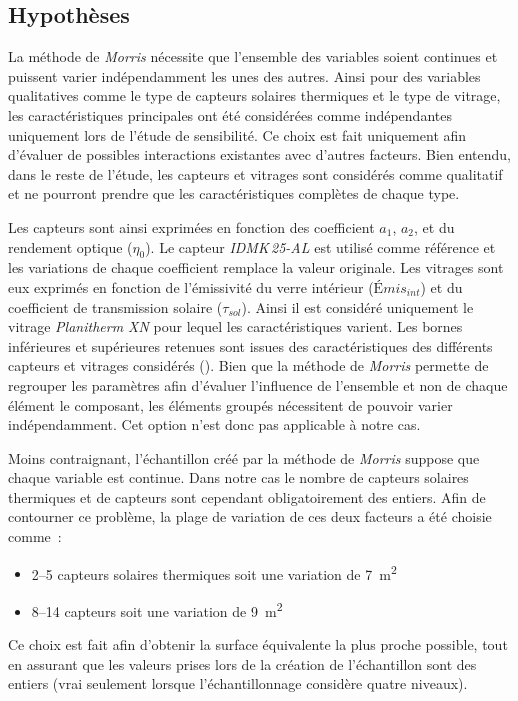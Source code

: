 \subsection{Hypothèses} %
\label{sub:hypotheses}
La méthode de \textit{Morris} nécessite que l’ensemble des variables soient continues et
puissent varier indépendamment les unes des autres. Ainsi pour des variables qualitatives
comme le type de capteurs solaires thermiques et le type de vitrage, les caractéristiques
principales ont été considérées comme indépendantes uniquement lors de l’étude de
sensibilité. Ce choix est fait uniquement afin d’évaluer de possibles interactions existantes avec d’autres facteurs.
Bien entendu, dans le reste de l’étude, les capteurs et vitrages sont considérés comme
qualitatif et ne pourront prendre que les caractéristiques complètes de chaque type.

Les capteurs sont ainsi exprimées en fonction des coefficient $a_{1}$,
$a_{2}$, et du rendement optique ($\eta_{0}$). Le capteur \textit{IDMK\,25-AL} est
utilisé comme référence et les variations de chaque coefficient remplace la valeur originale.
Les vitrages sont eux exprimés en fonction de l’émissivité
du verre intérieur ($Émis_{int}$) et du coefficient de transmission solaire ($\tau_{sol}$).
Ainsi il est considéré uniquement le vitrage \textit{Planitherm XN} pour lequel les
caractéristiques varient. Les bornes inférieures et supérieures retenues sont issues des caractéristiques
des différents capteurs et vitrages considérés ().
Bien que la méthode de \textit{Morris} permette de regrouper les paramètres afin d’évaluer
l’influence de l’ensemble et non de chaque élément le composant, les éléments groupés
nécessitent de pouvoir varier indépendamment. Cet option n’est donc pas applicable à notre cas.


Moins contraignant, l’échantillon créé par la méthode de \textit{Morris} suppose que
chaque variable est continue. Dans notre cas le nombre de capteurs solaires thermiques
et de capteurs  sont cependant obligatoirement des entiers. Afin de contourner
ce problème, la plage de variation de ces deux facteurs a été choisie comme~:
\begin{itemize}
  \item \SIrange{2}{5}{} capteurs solaires thermiques soit une variation de \SI{7}{\metre\squared}
  \item \SIrange{8}{14}{} capteurs  soit une variation de \SI{9}{\metre\squared}
\end{itemize}
Ce choix est fait afin d’obtenir la surface équivalente la plus proche possible, tout
en assurant que les valeurs prises lors de la création de l’échantillon sont des entiers
(vrai seulement lorsque l’échantillonnage considère quatre niveaux).


